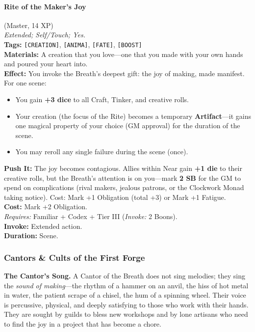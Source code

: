 \paragraph{Rite of the Maker's Joy} (Master, 14 XP) \hfill \\
\emph{Extended; Self/Touch; Yes.} \\
\textbf{Tags:} \texttt{[CREATION]}, \texttt{[ANIMA]}, \texttt{[FATE]}, \texttt{[BOOST]} \\
\textbf{Materials:} A creation that you love---one that you made with your own hands and poured your heart into. \\
\textbf{Effect:} You invoke the Breath's deepest gift: the joy of making, made manifest. For one scene:
\begin{itemize}
  \item You gain \textbf{+3 dice} to all Craft, Tinker, and creative rolls.
  \item Your creation (the focus of the Rite) becomes a temporary \textbf{Artifact}---it gains one magical property of your choice (GM approval) for the duration of the scene.
  \item You may reroll any single failure during the scene (once).
\end{itemize}
\textbf{Push It:} The joy becomes contagious. Allies within Near gain \textbf{+1 die} to their creative rolls, but the Breath's attention is on you---mark \textbf{2 SB} for the GM to spend on complications (rival makers, jealous patrons, or the Clockwork Monad taking notice). Cost: Mark +1 Obligation (total +3) or Mark +1 Fatigue. \\
\textbf{Cost:} Mark +2 Obligation. \\
\textit{Requires:} Familiar + Codex + Tier III (\textit{Invoke:} 2 Boons). \\
\textbf{Invoke:} Extended action. \\
\textbf{Duration:} Scene.

\subsubsection*{Cantors \& Cults of the First Forge}
\textbf{The Cantor's Song.} A Cantor of the Breath does not sing melodies; they sing the \emph{sound of making}---the rhythm of a hammer on an anvil, the hiss of hot metal in water, the patient scrape of a chisel, the hum of a spinning wheel. Their voice is percussive, physical, and deeply satisfying to those who work with their hands. They are sought by guilds to bless new workshops and by lone artisans who need to find the joy in a project that has become a chore.


